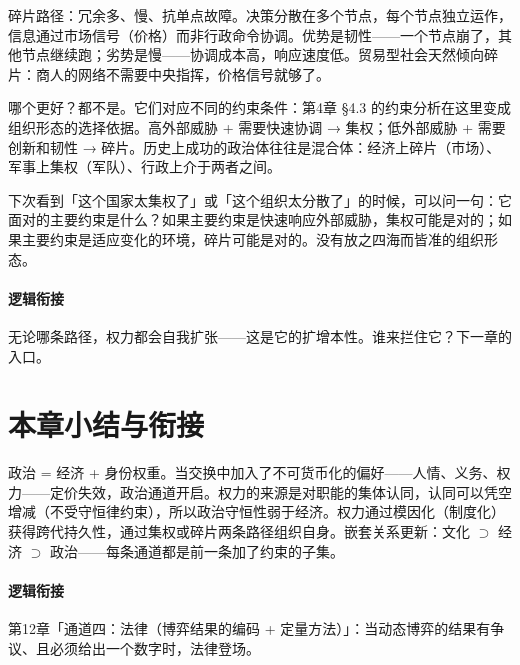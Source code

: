 \documentclass[../../main2.tex]{subfiles}
\begin{document}
	碎片路径：冗余多、慢、抗单点故障。决策分散在多个节点，每个节点独立运作，信息通过市场信号（价格）而非行政命令协调。优势是韧性——一个节点崩了，其他节点继续跑；劣势是慢——协调成本高，响应速度低。贸易型社会天然倾向碎片：商人的网络不需要中央指挥，价格信号就够了。

	哪个更好？都不是。它们对应不同的约束条件：第4章 §4.3 的约束分析在这里变成组织形态的选择依据。高外部威胁 + 需要快速协调 → 集权；低外部威胁 + 需要创新和韧性 → 碎片。历史上成功的政治体往往是混合体：经济上碎片（市场）、军事上集权（军队）、行政上介于两者之间。

	\begin{readingnote}
		下次看到「这个国家太集权了」或「这个组织太分散了」的时候，可以问一句：它面对的主要约束是什么？如果主要约束是快速响应外部威胁，集权可能是对的；如果主要约束是适应变化的环境，碎片可能是对的。没有放之四海而皆准的组织形态。
	\end{readingnote}

	\paragraph*{逻辑衔接}
	无论哪条路径，权力都会自我扩张——这是它的扩增本性。谁来拦住它？下一章的入口。
	\section{本章小结与衔接}
	\label{sec:pol-summary}
	政治 = 经济 + 身份权重。当交换中加入了不可货币化的偏好——人情、义务、权力——定价失效，政治通道开启。权力的来源是对职能的集体认同，认同可以凭空增减（不受守恒律约束），所以政治守恒性弱于经济。权力通过模因化（制度化）获得跨代持久性，通过集权或碎片两条路径组织自身。嵌套关系更新：文化 $\supset$ 经济 $\supset$ 政治——每条通道都是前一条加了约束的子集。

	\paragraph*{逻辑衔接}
	第12章「通道四：法律（博弈结果的编码 + 定量方法）」：当动态博弈的结果有争议、且必须给出一个数字时，法律登场。
\end{document}
